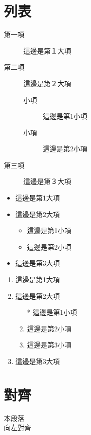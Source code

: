 \newpage

\section{列表} \label{sec_item}

\begin{description}
    \item[第一項] 這邊是第１大項
    \item[第二項] 這邊是第２大項
        \begin{description}
            \item[小項] 這邊是第1小項
            \item[小項] 這邊是第2小項
        \end{description}
    \item[第三項] 這邊是第３大項
\end{description}

\begin{itemize}
    \item 這邊是第1大項
    \item 這邊是第2大項
        \begin{itemize}
            \item 這邊是第1小項
            \item 這邊是第2小項
        \end{itemize}
    \item 這邊是第3大項
\end{itemize}

\begin{enumerate}
    \item 這邊是第1大項
    \item 這邊是第2大項
        \begin{enumerate}
            \item[*] 這邊是第1小項
            \item 這邊是第2小項
            \item 這邊是第3小項
        \end{enumerate}
    \item 這邊是第3大項
\end{enumerate}

\newpage

\section{對齊}
\begin{flushleft}
    本段落\\
    向左對齊
\end{flushleft}

